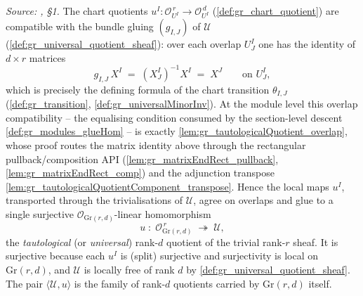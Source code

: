 \begin{definition}\leanok
  \label{def:tautological_quotient}
  \textit{Source: \cite{nitsure-hilbert-quot}, \S 1.}
  The chart quotients \(u^I : \mathcal{O}_{U^I}^{\,r} \to \mathcal{O}_{U^I}^{\,d}\)
  (\cref{def:gr_chart_quotient}) are compatible with the bundle gluing
  \((g_{I,J})\) of \(\mathcal{U}\) (\cref{def:gr_universal_quotient_sheaf}): over
  each overlap \(U^I_J\) one has the identity of \(d \times r\) matrices
  \[
    g_{I,J}\, X^I \;=\; (X^I_J)^{-1} X^I \;=\; X^J \qquad \text{on } U^I_J,
  \]
  which is precisely the defining formula of the chart transition
  \(\theta_{I,J}\) (\cref{def:gr_transition}, \cref{def:gr_universalMinorInv}). At the
  module level this overlap compatibility -- the equalising condition consumed by the
  section-level descent \cref{def:gr_modules_glueHom} -- is exactly
  \cref{lem:gr_tautologicalQuotient_overlap}, whose proof routes the matrix identity above
  through the rectangular pullback/composition API
  (\cref{lem:gr_matrixEndRect_pullback}, \cref{lem:gr_matrixEndRect_comp}) and the
  adjunction transpose \cref{lem:gr_tautologicalQuotientComponent_transpose}.
  Hence the local maps \(u^I\), transported through the trivialisations of
  \(\mathcal{U}\), agree on overlaps and glue to a single surjective
  \(\mathcal{O}_{\mathrm{Gr}(r,d)}\)-linear homomorphism
  \[
    u \;:\; \mathcal{O}_{\mathrm{Gr}(r,d)}^{\,r}
      \;\twoheadrightarrow\; \mathcal{U},
  \]
  the \emph{tautological} (or \emph{universal}) rank-\(d\) quotient of the trivial
  rank-\(r\) sheaf. It is surjective because each \(u^I\) is (split) surjective and
  surjectivity is local on \(\mathrm{Gr}(r,d)\), and \(\mathcal{U}\) is locally
  free of rank \(d\) by \cref{def:gr_universal_quotient_sheaf}. The pair
  \(\langle \mathcal{U}, u \rangle\) is the family of rank-\(d\) quotients carried
  by \(\mathrm{Gr}(r,d)\) itself.
\end{definition}

